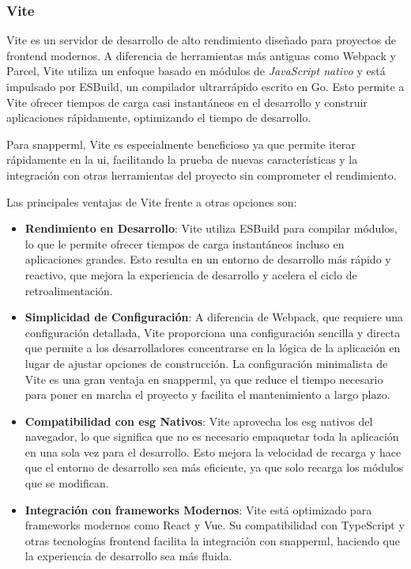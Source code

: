 \subsubsection{Vite}

Vite es un servidor de desarrollo de alto rendimiento diseñado para proyectos de \gls{frontend} modernos. A diferencia de herramientas más antiguas como Webpack y Parcel, Vite utiliza un enfoque basado en módulos de \textit{JavaScript nativo} y está impulsado por ESBuild, un compilador ultrarrápido escrito en Go. Esto permite a Vite ofrecer tiempos de carga casi instantáneos en el desarrollo y construir aplicaciones rápidamente, optimizando el tiempo de desarrollo.

Para \Gls{snapperml}, Vite es especialmente beneficioso ya que permite iterar rápidamente en la \acrlong{ui}, facilitando la prueba de nuevas características y la integración con otras herramientas del proyecto sin comprometer el rendimiento.

Las principales ventajas de Vite frente a otras opciones son:

\begin{itemize}
    \item \textbf{Rendimiento en Desarrollo}: Vite utiliza ESBuild para compilar módulos, lo que le permite ofrecer tiempos de carga instantáneos incluso en aplicaciones grandes. Esto resulta en un entorno de desarrollo más rápido y reactivo, que mejora la experiencia de desarrollo y acelera el ciclo de retroalimentación.
    \item \textbf{Simplicidad de Configuración}: A diferencia de Webpack, que requiere una configuración detallada, Vite proporciona una configuración sencilla y directa que permite a los desarrolladores concentrarse en la lógica de la aplicación en lugar de ajustar opciones de construcción. La configuración minimalista de Vite es una gran ventaja en \Gls{snapperml}, ya que reduce el tiempo necesario para poner en marcha el proyecto y facilita el mantenimiento a largo plazo.

    \item \textbf{Compatibilidad con \Gls{esg} Nativos}: Vite aprovecha los \gls{esg} nativos del navegador, lo que significa que no es necesario empaquetar toda la aplicación en una sola vez para el desarrollo. Esto mejora la velocidad de recarga y hace que el entorno de desarrollo sea más eficiente, ya que solo recarga los módulos que se modifican.

    \item \textbf{Integración con \Glspl{framework} Modernos}: Vite está optimizado para \glspl{framework} modernos como React y Vue. Su compatibilidad con TypeScript y otras tecnologías \gls{frontend} facilita la integración con \Gls{snapperml}, haciendo que la experiencia de desarrollo sea más fluida.
\end{itemize}

